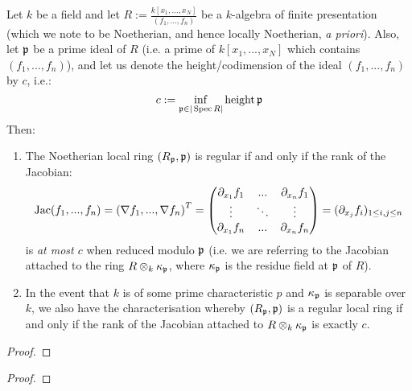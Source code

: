                 \begin{proposition} \label{prop: jacobian_criterion_for_regularity}
                    Let $k$ be a field and let $R := \frac{k[x_1, ..., x_N]}{(f_1, ..., f_n)}$ be a $k$-algebra of finite presentation (which we note to be Noetherian, and hence locally Noetherian, \textit{a priori}). Also, let $\mathfrak{p}$ be a prime ideal of $R$ (i.e. a prime of $k[x_1, ..., x_N]$ which contains $(f_1, ..., f_n)$), and let us denote the height/codimension of the ideal $(f_1, ..., f_n)$ by $c$, i.e.:
                        $$c := \inf_{\mathfrak{p} \in |\operatorname{Spec} R|} \operatorname{height} \mathfrak{p}$$
                    Then:
                        \begin{enumerate}
                            \item The Noetherian local ring $(R_{\mathfrak{p}}, \mathfrak{p})$ is regular if and only if the rank of the Jacobian:
                                $$
                                    \operatorname{Jac}(f_1, ..., f_n) = \left(\nabla f_1, ..., \nabla f_n\right)^T = 
                                            \begin{pmatrix}
                                                \partial_{x_1} f_1 & ... & \partial_{x_n} f_1
                                                \\
                                                \vdots & \ddots & \vdots
                                                \\
                                                \partial_{x_1} f_n & ... & \partial_{x_n} f_n
                                            \end{pmatrix}
                                        = (\partial_{x_j} f_i)_{1 \leq i, j \leq n}
                                $$
                            is \textit{at most $c$} when reduced modulo $\mathfrak{p}$ (i.e. we are referring to the Jacobian attached to the ring $R \tensor_k \kappa_{\p}$, where $\kappa_{\mathfrak{p}}$ is the residue field at $\mathfrak{p}$ of $R$). 
                            \item In the event that $k$ is of some prime characteristic $p$ and $\kappa_{\mathfrak{p}}$ is separable over $k$, we also have the characterisation whereby $(R_{\mathfrak{p}}, \mathfrak{p})$ is a regular local ring if and only if the rank of the Jacobian attached to $R \tensor_k \kappa_{\p}$ is exactly $c$. 
                        \end{enumerate}
                \end{proposition}
                    \begin{proof}
                        
                    \end{proof}
                \begin{corollary}
                    
                \end{corollary}
                    \begin{proof}
                        
                    \end{proof}
                    
